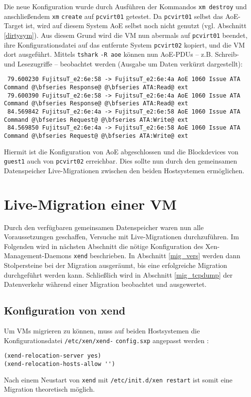 Die neue Konfiguration wurde durch Ausführen der Kommandos \verb#xm destroy# und anschließendem \verb#xm# \verb#create# auf \verb#pcvirt01# getestet. Da \verb#pcvirt01# selbst das AoE-Target ist, wird auf diesem System AoE selbst noch nicht genutzt (vgl. Abschnitt \ref{dirtysym}).
Aus diesem Grund wird die VM nun abermals auf \verb#pcvirt01# beendet, ihre Konfigurationsdatei auf das entfernte System \verb#pcvirt02# kopiert, und die VM dort ausgeführt. Mittels \verb#tshark# \verb#-R aoe# können nun AoE-PDUs -- z.B. Schreib- und Lesezugriffe -- beobachtet werden (Ausgabe um Daten verkürzt dargestellt):
\setupVerbatimOut
\begin{verbatim}
 79.600230 FujitsuT_e2:6e:58 -> FujitsuT_e2:6e:4a AoE 1060 Issue ATA Command @\bfseries Response@ @\bfseries ATA:Read@ ext
 79.600390 FujitsuT_e2:6e:58 -> FujitsuT_e2:6e:4a AoE 1060 Issue ATA Command @\bfseries Response@ @\bfseries ATA:Read@ ext
 84.569842 FujitsuT_e2:6e:4a -> FujitsuT_e2:6e:58 AoE 1060 Issue ATA Command @\bfseries Request@ @\bfseries ATA:Write@ ext
 84.569850 FujitsuT_e2:6e:4a -> FujitsuT_e2:6e:58 AoE 1060 Issue ATA Command @\bfseries Request@ @\bfseries ATA:Write@ ext
\end{verbatim}

Hiermit ist die Konfiguration von AoE abgeschlossen und die Blockdevices von \verb#guest1# auch von \verb#pcvirt02# erreichbar. Dies sollte nun durch den gemeinsamen Datenspeicher Live-Migrationen zwischen den beiden Hostsystemen ermöglichen.

\chapter{Live-Migration einer VM}\label{migr}
Durch den verfügbaren gemeinsamen Datenspeicher waren nun alle Voraussetzungen geschaffen, Versuche mit Live-Migrationen durchzuführen. Im Folgenden wird in nächsten Abschnitt die nötige Konfiguration des Xen-Management-Daemons \verb#xend# beschrieben. In Abschnitt \ref{mig_vers} werden dann Stolpersteine bei der Migration ausgeräumt, bis eine erfolgreiche Migration durchgeführt werden kann. Schließlich wird in Abschnitt \ref{mig_tcpdump} der Datenverkehr während einer Migration beobachtet und ausgewertet.
\section{Konfiguration von xend}\label{xend_konfig}
Um VMs migrieren zu können, muss auf beiden Hostsystemen die Konfigurationsdatei \verb#/etc/xen/xend-# \verb#config.sxp# angepasst werden \cite{man_xendconfig}:
\setupVerbatimOut
\begin{verbatim}
(xend-relocation-server yes)
(xend-relocation-hosts-allow '')
\end{verbatim} 
Nach einem Neustart von \verb#xend# mit \verb#/etc/init.d/xen restart# ist somit eine Migration theoretisch möglich. 

